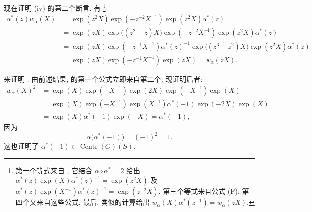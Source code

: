 现在证明 \textup{(iv)} 的第二个断言. 有%
\footnote{第一个等式来自  \textup{}, 它结合 \(\alpha\circ\alpha^\ast=2\) 给出 \(\alpha^\ast(z)\exp(X)\alpha^\ast(z)^{-1}=\exp(z^2X)\) 及 \(\alpha^\ast(z)\exp(X^{-1})\alpha^\ast(z)^{-1}=\exp(z^{-2}X)\). 第三个等式来自公式 \textup{(F)}, 第四个又来自这些公式. 最后, 类似的计算给出 \(w_\alpha(X)\alpha^\ast(z^{-1})=w_\alpha(zX)\).}
\[
\begin{aligned}
  \alpha^\ast(z)w_\alpha(X)
    &={}\exp(z^2X)\exp(-z^{-2}X^{-1})
       \exp(z^2X)\alpha^\ast(z)\\
    &={}\exp(zX)\exp\bigl((z^2-z)X\bigr)
       \exp(-z^{-2}X^{-1})\exp(z^2X)\alpha^\ast(z)\\
    &={}\exp(zX)\exp(-z^{-1}X^{-1})\alpha^\ast(z)^{-1}
       \exp\bigl((z^3-z^2)X\bigr)\exp(z^2X)\alpha^\ast(z)\\
    &={}\exp(zX)\exp(-z^{-1}X^{-1})\exp(zX)
       =w_\alpha(zX).
\end{aligned}
\]

来证明 \textup{}. 由前述结果, \textup{} 的第一个公式立即来自第二个; 现证明后者:
\[
\begin{aligned}
  w_\alpha(X)^2
    &={}\exp(X)\exp(-X^{-1})\exp(2X)\exp(-X^{-1})\exp(X)\\
    &={}\exp(X)\exp(-X^{-1})\exp(X^{-1})
       \alpha^\ast(-1)\exp(-2X)\exp(X)\\
    &={}\exp(X)\alpha^\ast(-1)\exp(-X)
       =\alpha^\ast(-1),
\end{aligned}
\]
因为
\[
  \alpha\bigl(\alpha^\ast(-1)\bigr)=(-1)^2=1.
\]
这也证明了 \(\alpha^\ast(-1)\in\operatorname{Centr}(G)(S)\).

